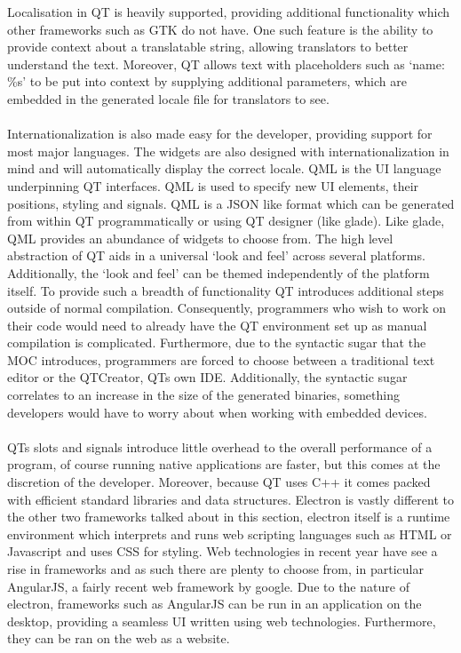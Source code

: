   Localisation in QT is heavily supported, providing additional functionality which other frameworks such as GTK do not have\cite{qt_localisation}. One such feature is the ability to provide context about a translatable string, allowing translators to better understand the text. Moreover, QT allows text with placeholders such as `name: \%s' to be put into context by supplying additional parameters, which are embedded in the generated locale file for translators to see. \\\\
  Internationalization is also made easy for the developer, providing support for most major languages\cite{qt_international}. The widgets are also designed with internationalization in mind and will automatically display the correct locale.
  QML is the UI language underpinning QT interfaces\cite{qt_qml}. QML is used to specify new UI elements, their positions, styling and signals. QML is a JSON like format which can be generated from within QT programmatically or using QT designer (like glade). Like glade, QML provides an abundance of widgets to choose from. The high level abstraction of QT aids in a universal `look and feel' across several platforms. Additionally, the `look and feel' can be themed independently of the platform itself.
  To provide such a breadth of functionality QT introduces additional steps outside of normal compilation. Consequently, programmers who wish to work on their code would need to already have the QT environment set up as manual compilation is complicated. Furthermore, due to the syntactic sugar that the MOC introduces, programmers are forced to choose between a traditional text editor or the QTCreator, QTs own IDE. Additionally,
  the syntactic sugar correlates to an increase in the size of the generated binaries, something developers would have to worry about when working with embedded devices.\\\\
  QTs slots and signals introduce little overhead to the overall performance of a program, of course running native applications are faster, but this comes at the discretion of the developer. Moreover, because QT uses C++ it comes packed with efficient standard libraries and data structures.
Electron is vastly different to the other two frameworks talked about in this section, electron itself is a runtime environment which interprets and runs web scripting languages such as HTML or Javascript and uses CSS for styling\cite{electron}. Web technologies in recent year have see a rise in frameworks and as such there are plenty to choose from, in particular AngularJS, a fairly recent web framework by google. Due to the nature of electron, frameworks such as AngularJS can be run in an application on the desktop, providing a seamless UI written using web technologies. Furthermore, they can be ran on the web as a website.
